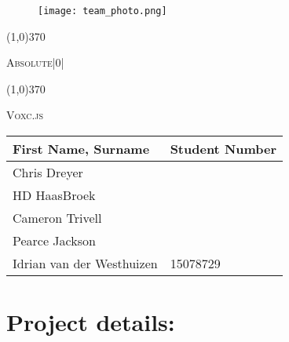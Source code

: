 \documentclass[english]{article}
\begin{document}
	
	
	\begin{figure}
		\texttt{[image: team\_photo.png]}
	\end{figure}
	
	\begin{center}
		\line(1,0){370}
		\\[0.2cm]
		{\scshape\Large Absolute|0|  \par}
		\vspace{0.1cm}
		\line(1,0){370}
		\\[0.8cm]
		
		{\scshape\Large Voxc.js \par}
		\vspace{0.9cm}
		
		\begin{tabu} to \textwidth { X[l] X[l]}
			\hline
			\textbf{First Name, Surname  }	& \textbf{Student Number}	\\ \hline \hline
			Chris Dreyer   	&	\\ \hline
			HD HaasBroek  	&	\\ \hline
			Cameron   Trivell		&	\\ \hline
			Pearce    Jackson		&	\\ \hline
			Idrian van der Westhuizen    &15078729	\\ \hline
			\hline
		\end{tabu}
		
	\end{center}
	
	
	\newpage
	\tableofcontents
	
	\newpage

	\section*{Project details:}
	\newline
	
\end{document}
